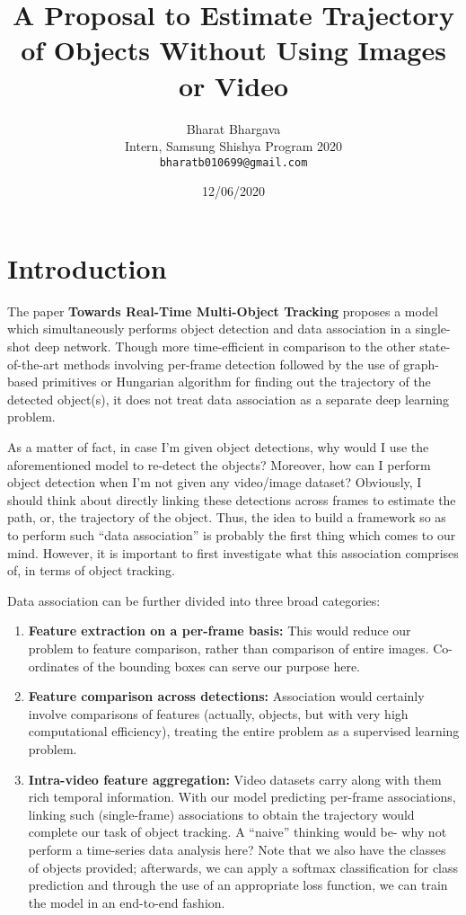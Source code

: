 \documentclass[a4paper]{article}
\title {A Proposal to Estimate Trajectory of Objects Without Using Images or Video}
\author{Bharat Bhargava\\Intern, Samsung Shishya Program 2020\\\texttt{bharatb010699@gmail.com}\\
}\date{12/06/2020}
\begin{document}
   \maketitle

\section{Introduction}
    The paper \textbf{Towards Real-Time Multi-Object Tracking}\cite{[3]} proposes a model which simultaneously performs object detection and data association in a single-shot deep network. Though more time-efficient in comparison to the other state-of-the-art methods involving per-frame detection followed by the use of graph-based primitives or Hungarian algorithm for finding out the trajectory of the detected object(s), it does not treat data association as a separate deep learning problem.
    
    
    As a matter of fact, in case I’m given object detections, why would I use the aforementioned model to re-detect the objects? Moreover, how can I perform object detection when I’m not given any video/image dataset? Obviously, I should think about directly linking these detections across frames to estimate the path, or, the trajectory of the object. Thus, the idea to build a framework so as to perform such “data association” is probably the first thing which comes to our mind. However, it is important to first investigate what this association comprises of, in terms of object tracking.
    
    
    Data association can be further divided into three broad categories:
    \begin{enumerate}
        \item \textbf {Feature extraction on a per-frame basis:}\cite{[2]} This would reduce our problem to feature comparison, rather than comparison of entire images. Co-ordinates of the bounding boxes can serve our purpose here.
        
        \item \textbf {Feature comparison across detections:}\cite{[1]}\cite{[2]} Association would certainly involve comparisons of features (actually, objects, but with very high computational efficiency), treating the entire problem as a supervised learning problem.
        
        \item \textbf{Intra-video feature aggregation:}\cite{[1]} Video datasets carry along with them rich temporal information. With our model predicting per-frame associations, linking such (single-frame) associations to obtain the trajectory would complete our task of object tracking. A “naive” thinking would be- why not perform a time-series data analysis here? Note that we also have the classes of objects provided; afterwards, we can apply a softmax classification for class prediction and through the use of an appropriate loss function, we can train the model in an end-to-end fashion.
    \end{enumerate}
\end{document}
